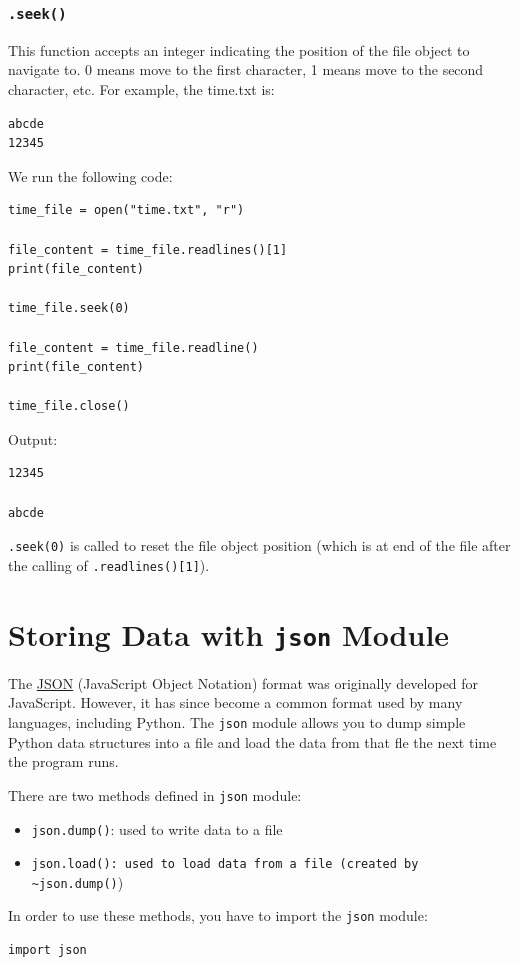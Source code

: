 \documentclass[12pt]{book}
\begin{document}
\subsubsection{\texttt{.seek()}}
\label{sec:org697a9c5}
This function accepts an integer indicating the position of the file object to navigate to. 0 means move to the first character, 1 means move to the second character, etc. For example, the time.txt is:
\begin{verbatim}
abcde
12345
\end{verbatim}
We run the following code:
\begin{verbatim}
time_file = open("time.txt", "r")

file_content = time_file.readlines()[1]
print(file_content)

time_file.seek(0)

file_content = time_file.readline()
print(file_content)

time_file.close()
\end{verbatim}
Output:
\begin{verbatim}
12345

abcde

\end{verbatim}
\texttt{.seek(0)} is called to reset the file object position (which is at end of the file after the calling of \texttt{.readlines()[1]}).
\section{Storing Data with \texttt{json} Module}
\label{sec:org2c2b337}
The \href{http://json.org/}{JSON} (JavaScript Object Notation) format was originally developed for JavaScript. However, it has since become a common format used by many languages, including Python. The \texttt{json} module allows you to dump simple Python data structures into a file and load the data from that fle the next time the program runs.

There are two methods defined in \texttt{json} module:
\begin{itemize}
\item \texttt{json.dump()}: used to write data to a file
\item \texttt{json.load(): used to load data from a file (created by \textasciitilde{}json.dump()})
\end{itemize}
In order to use these methods, you have to import the \texttt{json} module:
\begin{verbatim}
import json
\end{verbatim}
\end{document}

